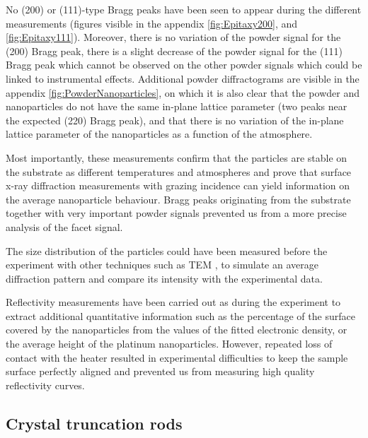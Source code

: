 No (200) or (111)-type Bragg peaks have been seen to appear during the different measurements (figures visible in the appendix \ref{fig:Epitaxy200}, and \ref{fig:Epitaxy111}).
Moreover, there is no variation of the powder signal for the (200) Bragg peak, there is a slight decrease of the powder signal for the (111) Bragg peak which cannot be observed on the other powder signals which could be linked to instrumental effects.
Additional powder diffractograms are visible in the appendix \ref{fig:PowderNanoparticles}, on which it is also clear that the powder and nanoparticles do not have the same in-plane lattice parameter (two peaks near the expected (220) Bragg peak), and that there is no variation of the in-plane lattice parameter of the nanoparticles as a function of the atmosphere.

Most importantly, these measurements confirm that the particles are stable on the substrate as different temperatures and atmospheres and prove that surface x-ray diffraction measurements with grazing incidence can yield information on the average nanoparticle behaviour.
Bragg peaks originating from the  substrate together with very important powder signals prevented us from a more precise analysis of the facet signal.

The size distribution of the particles could have been measured before the experiment with other techniques such as TEM \parencite{Hejral2013}, to simulate an average diffraction pattern and compare its intensity with the experimental data.

Reflectivity measurements have been carried out as during the experiment to extract additional quantitative information such as the percentage of the surface covered by the nanoparticles from the values of the fitted electronic density, or the average height of the platinum nanoparticles.
However, repeated loss of contact with the heater resulted in experimental difficulties to keep the sample surface perfectly aligned and prevented us from measuring high quality reflectivity curves.

\subsection{Crystal truncation rods}

